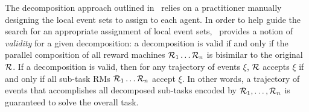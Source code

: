 The decomposition approach outlined in~\cite{neary2020reward} relies on a practitioner manually designing the local event sets to assign to each agent.  
In order to help guide the search for an appropriate assignment of local event sets,~\cite{neary2020reward} provides a notion of \textit{validity} for a given decomposition: a decomposition is valid if and only if the parallel composition of all reward machines $\mathcal{R}_1 \dots \mathcal{R}_n$ is bisimilar to the original $\mathcal{R}$. If a decomposition is valid, then for any trajectory of events $\xi$, $\mathcal{R}$ accepts $\xi$ if and only if all sub-task RMs $\mathcal{R}_1 \dots \mathcal{R}_n$ accept $\xi$.
In other words, a trajectory of events that accomplishes all decomposed sub-tasks encoded by $\mathcal{R}_1, \dots, \mathcal{R}_n$ is guaranteed to solve the overall task. 
